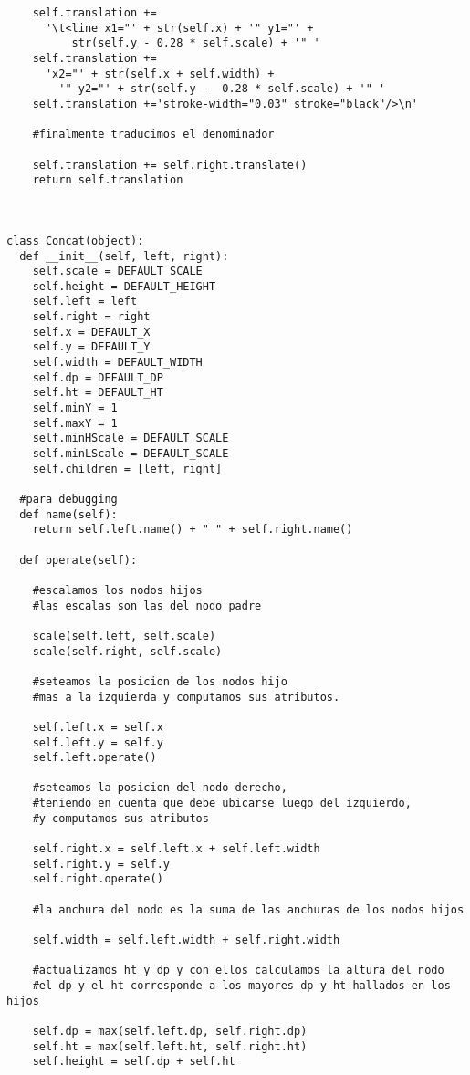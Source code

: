 \begin{verbatim}
    self.translation += 
      '\t<line x1="' + str(self.x) + '" y1="' + 
          str(self.y - 0.28 * self.scale) + '" '
    self.translation += 
      'x2="' + str(self.x + self.width) +
        '" y2="' + str(self.y -  0.28 * self.scale) + '" '
    self.translation +='stroke-width="0.03" stroke="black"/>\n'
    
    #finalmente traducimos el denominador

    self.translation += self.right.translate()
    return self.translation



class Concat(object):
  def __init__(self, left, right):
    self.scale = DEFAULT_SCALE
    self.height = DEFAULT_HEIGHT
    self.left = left
    self.right = right
    self.x = DEFAULT_X
    self.y = DEFAULT_Y
    self.width = DEFAULT_WIDTH
    self.dp = DEFAULT_DP
    self.ht = DEFAULT_HT
    self.minY = 1
    self.maxY = 1
    self.minHScale = DEFAULT_SCALE
    self.minLScale = DEFAULT_SCALE
    self.children = [left, right]
    
  #para debugging
  def name(self):
    return self.left.name() + " " + self.right.name()

  def operate(self):

    #escalamos los nodos hijos
    #las escalas son las del nodo padre

    scale(self.left, self.scale)
    scale(self.right, self.scale)

    #seteamos la posicion de los nodos hijo 
    #mas a la izquierda y computamos sus atributos.

    self.left.x = self.x
    self.left.y = self.y
    self.left.operate()

    #seteamos la posicion del nodo derecho, 
    #teniendo en cuenta que debe ubicarse luego del izquierdo,
    #y computamos sus atributos

    self.right.x = self.left.x + self.left.width
    self.right.y = self.y
    self.right.operate()

    #la anchura del nodo es la suma de las anchuras de los nodos hijos

    self.width = self.left.width + self.right.width

    #actualizamos ht y dp y con ellos calculamos la altura del nodo
    #el dp y el ht corresponde a los mayores dp y ht hallados en los hijos

    self.dp = max(self.left.dp, self.right.dp)
    self.ht = max(self.left.ht, self.right.ht)
    self.height = self.dp + self.ht
    


\end{verbatim}
